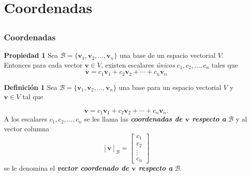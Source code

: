 \section{Coordenadas}

\subsection{}

{\nologo
\begin{frame}\frametitle{Coordenadas}

\vspace{-2mm}
\begin{prop}{\textbf{Propiedad 1}}
	Sea $\mathcal{B}=\{\mathbf{v}_1, \mathbf{v}_2, \hdots , \mathbf{v}_n \}$ una base de un espacio vectorial $V$. Entonces
	para cada vector $\mathbf{v}\in V$, existen escalares \textit{únicos} $c_1, c_2,\hdots, c_n$	
	tales que
	\[
	\mathbf{v} = c_1 \mathbf{v}_1 + c_2\mathbf{v}_2 + \cdots + c_n\mathbf{v}_n
	\]
\end{prop}	

\begin{defi}{\textbf{Definición 1}}
	Sea $\mathcal{B}=\{\mathbf{v}_1, \mathbf{v}_2, \hdots , \mathbf{v}_n \}$ una base para un espacio \hspace{-1mm} vectorial $V$ y 
	$\mathbf{v}\in V$ \hspace{-1mm} tal que
	
	\vspace{-5mm}
	\[
		\mathbf{v} = c_1 \mathbf{v}_1 + c_2\mathbf{v}_2 + \cdots + c_n\mathbf{v}_n.
	\]
	A los escalares $c_1, c_2,\hdots,c_n$
	se les llama las \textbf{\textit{coordenadas de $\mathbf{v}$ respecto a}} $\mathcal{B}$ y al vector columna
	\[
		\left[ \mathbf{v} \right]_{\mathcal{B}} = 
		\left[
			\begin{array}{c}
				c_1\\
				c_2\\
				\vdots\\
				c_n
			\end{array}
		\right]
	\]
	se le denomina el \textbf{\textit{vector coordenado de $\mathbf{v}$ respecto a}} $\mathcal{B}$.
\end{defi}	

\end{frame}
}
	

\subsection{}

